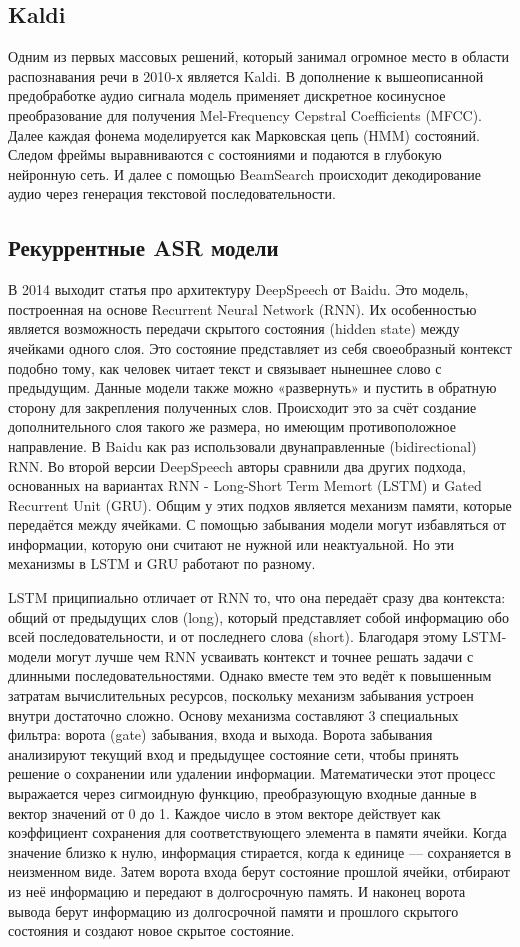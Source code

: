 \subsection{Kaldi}
Одним из первых массовых решений, который занимал огромное место в области распознавания речи в 2010-х является Kaldi.
В дополнение к вышеописанной предобработке аудио сигнала модель применяет дискретное косинусное преобразование для получения Mel-Frequency Cepstral Coefficients (MFCC).
Далее каждая фонема моделируется как Марковская цепь (HMM) состояний.
Следом фреймы выравниваются с состояниями и подаются в глубокую нейронную сеть.
И далее с помощью BeamSearch происходит декодирование аудио через генерация текстовой последовательности.

\subsection{Рекуррентные ASR модели}
В 2014 выходит статья про архитектуру DeepSpeech от Baidu. 
Это модель, построенная на основе Recurrent Neural Network (RNN).
Их особенностью является возможность передачи скрытого состояния (hidden state) между ячейками одного слоя.
Это состояние представляет из себя своеобразный контекст подобно тому, как человек читает текст и связывает нынешнее слово с предыдущим.
Данные модели также можно «развернуть» и пустить в обратную сторону для закрепления полученных слов.
Происходит это за счёт создание дополнительного слоя такого же размера, но имеющим противоположное направление.
В Baidu как раз использовали двунаправленные (bidirectional) RNN.
Во второй версии DeepSpeech авторы сравнили два других подхода, основанных на вариантах RNN - Long-Short Term Memort (LSTM) и Gated Recurrent Unit (GRU).
Общим у этих подхов является механизм памяти, которые передаётся между ячейками.
С помощью забывания модели могут избавляться от информации, которую они считают не нужной или неактуальной.
Но эти механизмы в LSTM и GRU работают по разному.

LSTM приципиально отличает от RNN то, что она передаёт сразу два контекста: общий от предыдущих слов (long), который представляет собой информацию обо всей последовательности, и от последнего слова (short).
Благодаря этому LSTM-модели могут лучше чем RNN усваивать контекст и точнее решать задачи с длинными последовательностями.
Однако вместе тем это ведёт к повышенным затратам вычислительных ресурсов, поскольку механизм забывания устроен внутри достаточно сложно.
Основу механизма составляют 3 специальных фильтра: ворота (gate) забывания, входа и выхода.
Ворота забывания анализируют текущий вход и предыдущее состояние сети, чтобы принять решение о сохранении или удалении информации.
Математически этот процесс выражается через сигмоидную функцию, преобразующую входные данные в вектор значений от 0 до 1.
Каждое число в этом векторе действует как коэффициент сохранения для соответствующего элемента в памяти ячейки.
Когда значение близко к нулю, информация стирается, когда к единице — сохраняется в неизменном виде.
Затем ворота входа берут состояние прошлой ячейки, отбирают из неё информацию и передают в долгосрочную память.
И наконец ворота вывода берут информацию из долгосрочной памяти и прошлого скрытого состояния и создают новое скрытое состояние.

